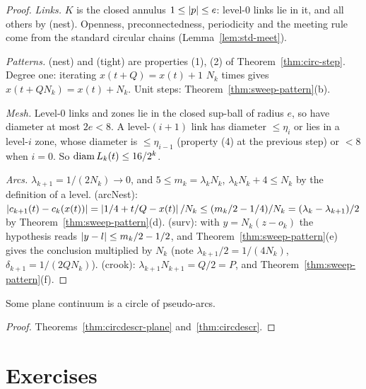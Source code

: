 \begin{proof}
\emph{Links.} $K$ is the closed annulus $1\le\left\lvert p\right\rvert\le e$: level-$0$ links lie in it, and all others by (nest). Openness, preconnectedness, periodicity and the meeting rule come from the standard
circular chains (Lemma~\ref{lem:std-meet}).

\emph{Patterns.} (nest) and (tight) are properties (1), (2) of Theorem~\ref{thm:circ-step}. Degree one: iterating $x(t+Q)=x(t)+1$ $N_k$ times gives $x(t+QN_k)=x(t)+N_k$. Unit steps: Theorem~\ref{thm:sweep-pattern}(b).

\emph{Mesh.} Level-$0$ links and zones lie in the closed sup-ball of radius $e$, so have diameter at most $2e<8$. A level-$(i+1)$ link has diameter $\le\eta_i$ or lies in a level-$i$ zone, whose
diameter is $\le\eta_{i-1}$ (property (4) at the previous step) or $<8$ when $i=0$. So $\operatorname{diam} L_k(t)\le16/2^k$.

\emph{Arcs.} $\lambda_{k+1}=1/(2N_k)\to0$, and $5\le m_k=\lambda_kN_k$, $\lambda_kN_k+4\le N_k$ by the definition of a level. (arcNest): $\left\lvert c_{k+1}(t)-c_k(x(t))\right\rvert=\left\lvert 1/4+t/Q-x(t)\right\rvert/N_k\le(m_k/2-1/4)/N_k=(\lambda_k-\lambda_{k+1})/2$ by
Theorem~\ref{thm:sweep-pattern}(d). (surv): with $y=N_k(z-o_k)$ the hypothesis reads $\left\lvert y-l\right\rvert\le m_k/2-1/2$, and Theorem~\ref{thm:sweep-pattern}(e) gives the conclusion multiplied by $N_k$ (note
$\lambda_{k+1}/2=1/(4N_k)$, $\delta_{k+1}=1/(2QN_k)$). (crook): $\lambda_{k+1}N_{k+1}=Q/2=P$, and Theorem~\ref{thm:sweep-pattern}(f).
\end{proof}


\begin{theorem}\label{thm:plane-example}
Some plane continuum is a circle of pseudo-arcs.
\end{theorem}

\begin{proof}
Theorems~\ref{thm:circdescr-plane} and~\ref{thm:circdescr}.
\end{proof}


\section*{Exercises}


